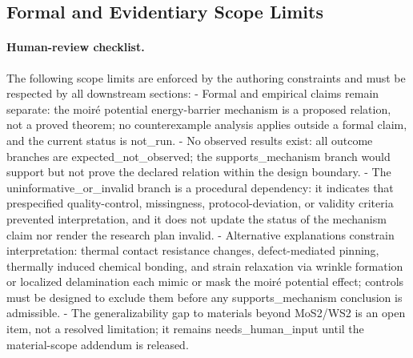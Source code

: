 \documentclass[conference]{IEEEtran}
\begin{document}
\subsection{Formal and Evidentiary Scope Limits}
\paragraph{Human-review checklist.} The following scope limits are enforced by the authoring constraints and must be respected by all downstream sections: - Formal and empirical claims remain separate: the moiré potential energy-barrier mechanism is a proposed relation, not a proved theorem; no counterexample analysis applies outside a formal claim, and the current status is not\_run. - No observed results exist: all outcome branches are expected\_not\_observed; the supports\_mechanism branch would support but not prove the declared relation within the design boundary. - The uninformative\_or\_invalid branch is a procedural dependency: it indicates that prespecified quality-control, missingness, protocol-deviation, or validity criteria prevented interpretation, and it does not update the status of the mechanism claim nor render the research plan invalid. - Alternative explanations constrain interpretation: thermal contact resistance changes, defect-mediated pinning, thermally induced chemical bonding, and strain relaxation via wrinkle formation or localized delamination each mimic or mask the moiré potential effect; controls must be designed to exclude them before any supports\_mechanism conclusion is admissible. - The generalizability gap to materials beyond MoS2/WS2 is an open item, not a resolved limitation; it remains needs\_human\_input until the material-scope addendum is released.~\cite{cite_26ecaf73d88dfe33,cite_6b49ace365c37cc5,cite_b9cc1fcb55e94349}
\end{document}
